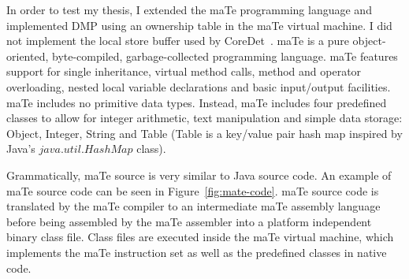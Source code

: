 In order to test my thesis, I extended the maTe programming language
and implemented DMP using an ownership table in the maTe virtual
machine.  I did not implement the local store buffer used by
CoreDet~\cite{coredet}.  maTe is a pure object-oriented,
byte-compiled, garbage-collected programming language.  maTe features
support for single inheritance, virtual method calls, method and
operator overloading, nested local variable declarations and basic
input/output facilities.  maTe includes no primitive data types.
Instead, maTe includes four predefined classes to allow for integer
arithmetic, text manipulation and simple data storage: Object,
Integer, String and Table (Table is a key/value pair hash map inspired
by Java's $java.util.HashMap$ class).

Grammatically, maTe source is very similar to Java source code.  An
example of maTe source code can be seen in Figure~\ref{fig:mate-code}.
maTe source code is translated by the maTe compiler to an intermediate
maTe assembly language before being assembled by the maTe assembler
into a platform independent binary class file.  Class files are
executed inside the maTe virtual machine, which implements the maTe
instruction set as well as the predefined classes in native code.

